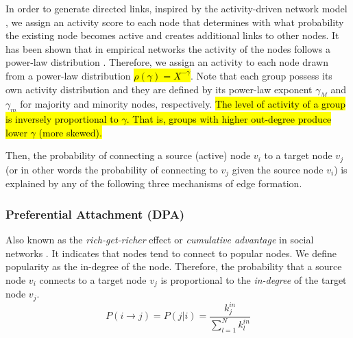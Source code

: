 \documentclass[fleqn,10pt]{wlscirep}
\begin{document}
In order to generate directed links, inspired by the activity-driven network model \cite{perra2012activity}, we assign an activity score to each node that determines with what probability the existing node becomes active and creates additional links to other nodes. It has been shown that in empirical networks the activity of the nodes follows a power-law distribution \cite{perra2012activity}. Therefore, we assign an activity to each node drawn from a power-law distribution \hl{$\rho(\gamma) = X^{-\gamma}$}. Note that each group possess its own activity distribution and they are defined by its power-law exponent $\gamma_M$ and $\gamma_m$ for majority and minority nodes, respectively. \hl{The level of activity of a group is inversely proportional to $\gamma$. That is, groups with higher out-degree produce lower $\gamma$ (more skewed).}

Then, the probability of connecting a source (active) node $v_i$ to a target node $v_j$ (or in other words the probability of connecting to $v_j$ given the source node $v_i$) is explained by any of the following three mechanisms of edge formation.

\subsubsection*{Preferential Attachment (DPA)}
Also known as the \textit{rich-get-richer} effect or \textit{cumulative advantage} in social networks \cite{merton1988matthew, barabasi1999emergence}. It indicates that nodes tend to connect to popular nodes. We define popularity as the in-degree of the node. Therefore, the probability that a source node $v_i$ connects to a target node $v_j$ is proportional to the \textit{in-degree} of the target node $v_j$. 
\begin{equation}
    P(i\to j) = P(j|i) = \frac{k^{in}_{j}}{\sum_{l=1}^{N} k^{in}_{l}}
\label{eq:PA}    
\end{equation}
\end{document}
